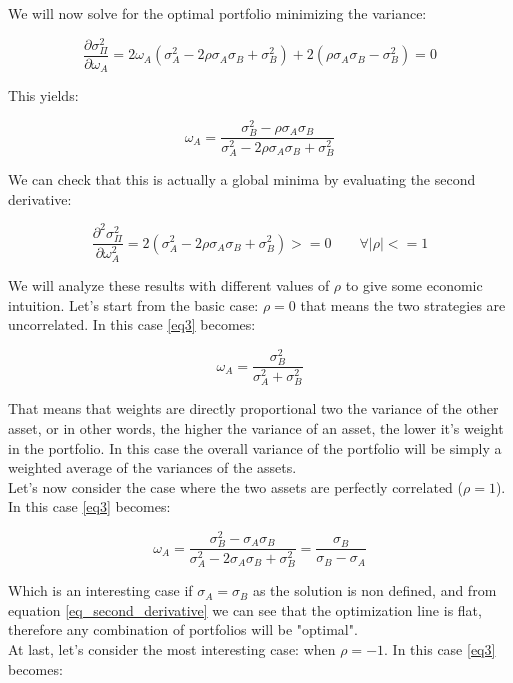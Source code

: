 We will now solve for the optimal portfolio minimizing the variance: 

\begin{equation} \label{eq2}
\frac{\partial \sigma^2_\Pi }{\partial \omega_A} = 2\omega_A(\sigma_A^2 - 2\rho \sigma_A \sigma_B + \sigma_B^2) + 2(\rho \sigma_A \sigma_B - \sigma_B^2) = 0
\end{equation}

This yields:

\begin{equation} \label{eq3}
\omega_A = \frac{\sigma_B^2-\rho \sigma_A \sigma_B}{\sigma_A^2 - 2\rho \sigma_A \sigma_B + \sigma_B^2}
\end{equation}

We can check that this is actually a global minima by evaluating the second derivative:

\begin{equation} \label{eq_second_derivative}
\displaystyle \frac{\partial^2 \sigma^2_\Pi }{\partial \omega_A^2} = 2(\sigma_A^2 - 2\rho \sigma_A \sigma_B + \sigma_B^2) >= 0 \qquad \forall \lvert \rho \rvert <= 1
\end{equation}

We will analyze these results with different values of $\rho$ to give some economic intuition. Let's start from the basic case:
$\rho = 0$ that means the two strategies are uncorrelated. In this case \eqref{eq3} becomes:

\begin{equation} \label{eq_rho_zero}
\omega_A = \frac{\sigma_B^2}{\sigma_A^2 + \sigma_B^2}
\end{equation}

That means that weights are directly proportional two the variance of the other asset, or in other words, the higher the variance of an asset, the lower it's weight in the portfolio. In this case the overall variance of the portfolio will be simply a weighted average of the variances of the assets.\\

Let's now consider the case where the two assets are perfectly correlated ($\rho = 1$).\\
In this case \eqref{eq3} becomes:

\begin{equation}
\omega_A = \frac{\sigma_B^2-\sigma_A \sigma_B}{\sigma_A^2 - 2\sigma_A \sigma_B + \sigma_B^2} = \frac{\sigma_B}{\sigma_B - \sigma_A}
\end{equation}
 
Which is an interesting case if $\sigma_A=\sigma_B$ as the solution is non defined, and from equation \eqref{eq_second_derivative} we can see that the optimization line is flat, therefore any combination of portfolios will be "optimal".\\
At last, let's consider the most interesting case: when $\rho = -1$. In this case \eqref{eq3} becomes:

